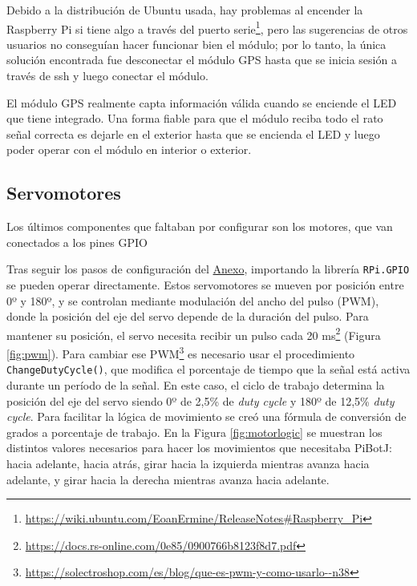Debido a la distribución de Ubuntu usada, hay problemas al encender la Raspberry Pi si tiene algo a través del puerto serie\footnote{\url{https://wiki.ubuntu.com/EoanErmine/ReleaseNotes\#Raspberry_Pi}}, pero las sugerencias de otros usuarios no conseguían hacer funcionar bien el módulo; por lo tanto, la única solución encontrada fue desconectar el módulo \acs{GPS} hasta que se inicia sesión a través de ssh y luego conectar el módulo.

El módulo GPS realmente capta información válida cuando se enciende el LED que tiene integrado. Una forma fiable para que el módulo reciba todo el rato señal correcta es dejarle en el exterior hasta que se encienda el LED y luego poder operar con el módulo en interior o exterior. 


\subsection{Servomotores}
\label{subsec:configmotores}

Los últimos componentes que faltaban por configurar son los motores, que van conectados a los pines GPIO 


Tras seguir los pasos de configuración del \hyperref[cap:capitulo9]{Anexo}, importando la librería \verb|RPi.GPIO| se pueden operar directamente. Estos servomotores se mueven por posición entre 0º y 180º, y se controlan mediante modulación del ancho del pulso (\ac{PWM}), donde la posición del eje del servo depende de la duración del pulso. Para mantener su posición, el servo necesita recibir un pulso cada 20 ms\footnote{\url{https://docs.rs-online.com/0e85/0900766b8123f8d7.pdf}} (Figura \ref{fig:pwm}). Para cambiar ese \ac{PWM}\footnote{\url{https://solectroshop.com/es/blog/que-es-pwm-y-como-usarlo--n38}} es necesario usar el procedimiento \verb|ChangeDutyCycle()|, que modifica el porcentaje de tiempo que la señal está activa durante un período de la señal. En este caso, el ciclo de trabajo determina la posición del eje del servo siendo 0º de 2,5\% de \textit{duty cycle} y 180º de 12,5\% \textit{duty cycle}. Para facilitar la lógica de movimiento se creó una fórmula de conversión de grados a porcentaje de trabajo. En la Figura \ref{fig:motorlogic} se muestran los distintos valores necesarios para hacer los movimientos que necesitaba PiBotJ: hacia adelante, hacia atrás, girar hacia la izquierda mientras avanza hacia adelante, y girar hacia la derecha mientras avanza hacia adelante.

